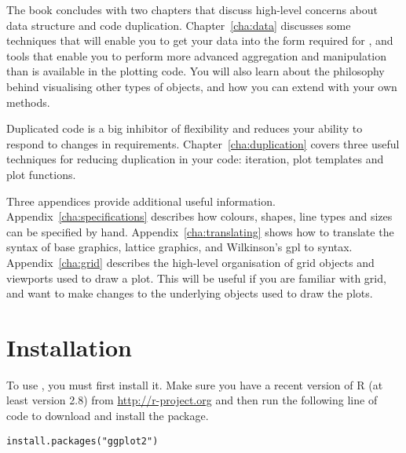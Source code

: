 The book concludes with two chapters that discuss high-level concerns about data structure and code duplication.  Chapter~\ref{cha:data} discusses some techniques that will enable you to get your data into the form required for \ggplot, and tools that enable you to perform more advanced aggregation and manipulation than is available in the plotting code. You will also learn about the \ggplot philosophy behind visualising other types of objects, and how you can extend \ggplot with your own methods.

Duplicated code is a big inhibitor of flexibility and reduces your ability to respond to changes in requirements. Chapter~\ref{cha:duplication} covers three useful techniques for reducing duplication in your code: iteration, plot templates and plot functions.

Three appendices provide additional useful information.  Appendix~\ref{cha:specifications} describes how colours, shapes, line types and sizes can be specified by hand.  Appendix~\ref{cha:translating} shows how to translate the syntax of base graphics, lattice graphics, and Wilkinson's {\sc gpl} to \ggplot syntax.  Appendix~\ref{cha:grid} describes the high-level organisation of grid objects and viewports used to draw a \ggplot plot.  This will be useful if you are familiar with grid, and want to make changes to the underlying objects used to draw the plots.

\section{Installation}\label{sub:installation}

To use \ggplot, you must first install it. Make sure you have a recent version of R (at least version 2.8) from \url{http://r-project.org} and then run the following line of code to download and install the \ggplot package.  

\begin{verbatim}
install.packages("ggplot2")
\end{verbatim}

% 
% 
% 

